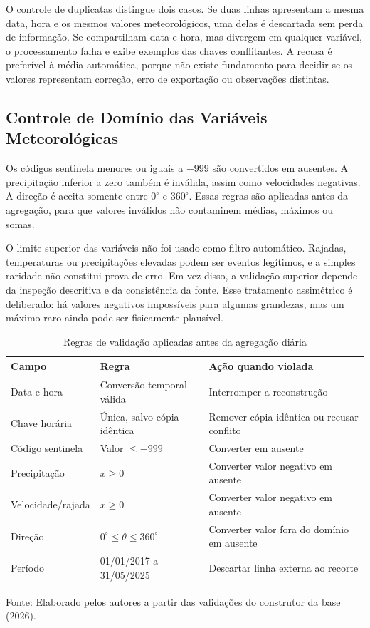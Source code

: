 O controle de duplicatas distingue dois casos. Se duas linhas apresentam a mesma data, hora e os mesmos valores meteorológicos, uma delas é descartada sem perda de informação. Se compartilham data e hora, mas divergem em qualquer variável, o processamento falha e exibe exemplos das chaves conflitantes. A recusa é preferível à média automática, porque não existe fundamento para decidir se os valores representam correção, erro de exportação ou observações distintas.

\subsection{Controle de Domínio das Variáveis Meteorológicas}

Os códigos sentinela menores ou iguais a $-999$ são convertidos em ausentes. A precipitação inferior a zero também é inválida, assim como velocidades negativas. A direção é aceita somente entre $0^\circ$ e $360^\circ$. Essas regras são aplicadas antes da agregação, para que valores inválidos não contaminem médias, máximos ou somas.

O limite superior das variáveis não foi usado como filtro automático. Rajadas, temperaturas ou precipitações elevadas podem ser eventos legítimos, e a simples raridade não constitui prova de erro. Em vez disso, a validação superior depende da inspeção descritiva e da consistência da fonte. Esse tratamento assimétrico é deliberado: há valores negativos impossíveis para algumas grandezas, mas um máximo raro ainda pode ser fisicamente plausível.

\begin{table}[H]
\centering
\caption{Regras de validação aplicadas antes da agregação diária}
\label{tab:validacao_dominios}
\small
\begin{tabularx}{\textwidth}{p{4.2cm} p{4.2cm} X}
\toprule
\textbf{Campo} & \textbf{Regra} & \textbf{Ação quando violada} \\
\midrule
Data e hora & Conversão temporal válida & Interromper a reconstrução \\
Chave horária & Única, salvo cópia idêntica & Remover cópia idêntica ou recusar conflito \\
Código sentinela & Valor $\leq -999$ & Converter em ausente \\
Precipitação & $x\geq0$ & Converter valor negativo em ausente \\
Velocidade/rajada & $x\geq0$ & Converter valor negativo em ausente \\
Direção & $0^\circ\leq\theta\leq360^\circ$ & Converter valor fora do domínio em ausente \\
Período & 01/01/2017 a 31/05/2025 & Descartar linha externa ao recorte \\
\bottomrule
\end{tabularx}
\small{Fonte: Elaborado pelos autores a partir das validações do construtor da base (2026).}
\end{table}

